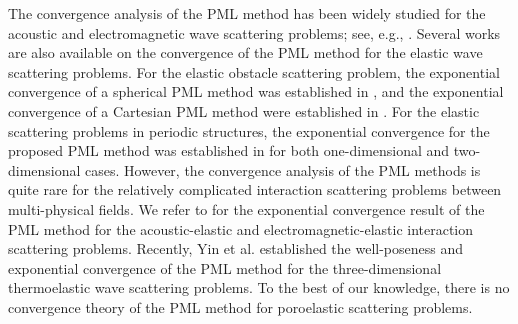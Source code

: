 \documentclass[11pt]{article}
\begin{document}
The convergence analysis of the PML method has been widely studied for the acoustic and electromagnetic wave scattering problems;
see, e.g., \cite{BW2005,Bramble2007,BP2013,CL2005,1998On,wyz2020,wyz2021}. Several works are also available on the convergence of 
the PML method for the elastic wave scattering problems. For the elastic obstacle scattering problem, the exponential convergence
of a spherical PML method was established in \cite{BPT2010}, and the exponential convergence of a Cartesian PML method were 
established in \cite{CXZ2016}. For the elastic scattering problems in periodic structures, the exponential convergence for the
proposed PML method was established in \cite{Jiang2017,Jiang2018} for both one-dimensional and two-dimensional cases. However,
the convergence analysis of the PML methods is quite rare for the relatively complicated interaction scattering problems between 
multi-physical fields. We refer to \cite{JL2017,Zhu2024} for the exponential convergence result of the PML method for the 
acoustic-elastic and electromagnetic-elastic interaction scattering problems. Recently, Yin et al. \cite{ywz2026} established the
well-poseness and exponential convergence of the PML method for the three-dimensional thermoelastic wave scattering problems. 
To the best of our knowledge, there is no convergence
theory of the PML method for poroelastic scattering problems.
\end{document}
